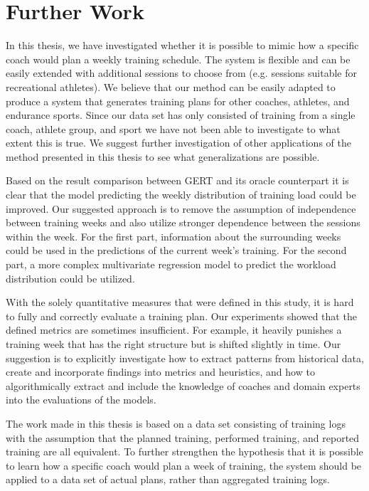 \chapter{Further Work}

In this thesis, we have investigated whether it is possible to mimic how a specific coach would plan a weekly training schedule.
The system is flexible and can be easily extended with additional sessions to choose from (e.g. sessions suitable for recreational athletes).
We believe that our method can be easily adapted to produce a system that generates training plans for other coaches, athletes, and endurance sports.
Since our data set has only consisted of training from a single coach, athlete group, and sport we have not been able to investigate to what extent this is true.
We suggest further investigation of other applications of the method presented in this thesis to see what generalizations are possible.

Based on the result comparison between GERT and its oracle counterpart it is clear that the model predicting the weekly distribution of training load could be improved.
Our suggested approach is to remove the assumption of independence between training weeks and also utilize stronger dependence between the sessions within the week.
For the first part, information about the surrounding weeks could be used in the predictions of the current week's training.
For the second part, a more complex multivariate regression model to predict the workload distribution could be utilized.

With the solely quantitative measures that were defined in this study, it is hard to fully and correctly evaluate a training plan.
Our experiments showed that the defined metrics are sometimes insufficient. 
For example, it heavily punishes a training week that has the right structure but is shifted slightly in time.
Our suggestion is to explicitly investigate how to extract patterns from historical data, create and incorporate findings into metrics and heuristics, and how to algorithmically extract and include the knowledge of coaches and domain experts into the evaluations of the models.

The work made in this thesis is based on a data set consisting of training logs with the assumption that the planned training, performed training, and reported training are all equivalent.
To further strengthen the hypothesis that it is possible to learn how a specific coach would plan a week of training, the system should be applied to a data set of actual plans, rather than aggregated training logs.